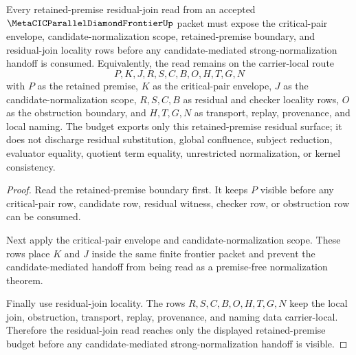 \begin{theorem}
\label{thm:metacic-parallel-diamond-frontier-retained-premise-residual-budget}
Every retained-premise residual-join read from an accepted $\MetaCICParallelDiamondFrontierUp$ packet must expose the critical-pair envelope, candidate-normalization scope, retained-premise boundary, and residual-join locality rows before any candidate-mediated strong-normalization handoff is consumed. Equivalently, the read remains on the carrier-local route
$$
P,K,J,R,S,C,B,O,H,T,G,N
$$
with $P$ as the retained premise, $K$ as the critical-pair envelope, $J$ as the candidate-normalization scope, $R,S,C,B$ as residual and checker locality rows, $O$ as the obstruction boundary, and $H,T,G,N$ as transport, replay, provenance, and local naming. The budget exports only this retained-premise residual surface; it does not discharge residual substitution, global confluence, subject reduction, evaluator equality, quotient term equality, unrestricted normalization, or kernel consistency.
\end{theorem}
\begin{proof}
Read the retained-premise boundary first. It keeps $P$ visible before any critical-pair row, candidate row, residual witness, checker row, or obstruction row can be consumed.

Next apply the critical-pair envelope and candidate-normalization scope. These rows place $K$ and $J$ inside the same finite frontier packet and prevent the candidate-mediated handoff from being read as a premise-free normalization theorem.

Finally use residual-join locality. The rows $R,S,C,B,O,H,T,G,N$ keep the local join, obstruction, transport, replay, provenance, and naming data carrier-local. Therefore the residual-join read reaches only the displayed retained-premise budget before any candidate-mediated strong-normalization handoff is visible.
\end{proof}
